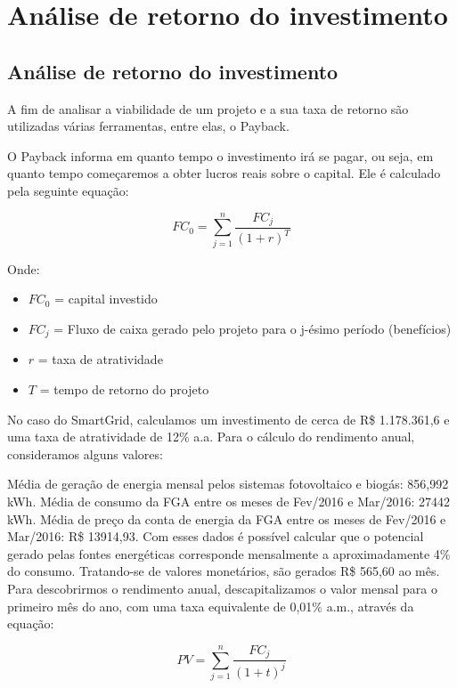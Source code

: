 \part{Análise de retorno do investimento}
\chapter[Análise de retorno do investimento]{Análise de retorno do investimento}

A fim de analisar a viabilidade de um projeto e a sua taxa de retorno são utilizadas várias ferramentas, entre elas, o Payback. 

O Payback informa em quanto tempo o investimento irá se pagar, ou seja, em quanto tempo começaremos a obter lucros reais sobre o capital. Ele é calculado pela seguinte equação:

$$FC_{0} = \sum_{j=1}^n \frac{FC_{j}}{(1+r)^{T}}$$

Onde: 
\begin{itemize}
\item $FC_{0}$ = capital investido

\item $FC_{j}$ = Fluxo de caixa gerado pelo projeto para o j-ésimo período (benefícios)

\item $r$ = taxa de atratividade 

\item $T$ = tempo de retorno do projeto

\end{itemize}


No caso do SmartGrid, calculamos um investimento de cerca de R\$ 1.178.361,6 e uma taxa de atratividade de 12\% a.a.
Para o cálculo do rendimento anual, consideramos alguns valores:

Média de geração de energia mensal pelos sistemas fotovoltaico e biogás: 856,992 kWh.
Média de consumo da FGA entre os meses de Fev/2016 e Mar/2016: 27442 kWh.
Média de preço da conta de energia da FGA entre os meses de Fev/2016 e Mar/2016: R\$ 13914,93.
Com esses dados é possível calcular que o potencial gerado pelas fontes energéticas corresponde mensalmente a aproximadamente 4\% do consumo. Tratando-se de valores monetários, são gerados R\$ 565,60 ao mês.
Para descobrirmos o rendimento anual, descapitalizamos o valor mensal para o primeiro mês do ano, com uma taxa equivalente de 0,01\% a.m., através da equação:

$$PV = \sum_{j=1}^n \frac{FC_{j}}{(1+t)^{j}}$$

